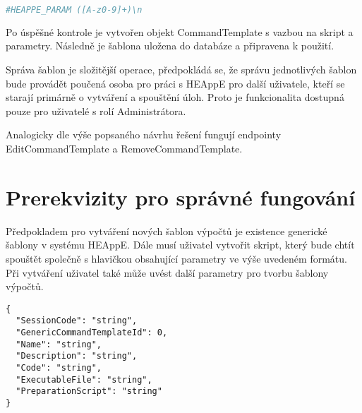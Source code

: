 \begin{lstlisting}[language=bash, caption={Regurální výraz pro parsování názvů parametrů}]
                                #HEAPPE_PARAM ([A-z0-9]+)\n
\end{lstlisting}

Po úspěšné kontrole je vytvořen objekt CommandTemplate s vazbou na skript a parametry. Následně je šablona uložena do databáze a připravena k použití.

Správa šablon je složitější operace, předpokládá se, že správu jednotlivých šablon bude provádět poučená osoba pro práci s HEAppE pro další uživatele, kteří se starají primárně o vytváření a spouštění úloh. Proto je funkcionalita dostupná pouze pro uživatelé s rolí Administrátora.

Analogicky dle výše popsaného návrhu řešení fungují endpointy EditCommandTemplate a RemoveCommandTemplate.

\section{Prerekvizity pro správné fungování}
Předpokladem pro vytváření nových šablon výpočtů je existence generické šablony v systému HEAppE. Dále musí uživatel vytvořit skript, který bude chtít spouštět společně s hlavičkou obsahující parametry ve výše uvedeném formátu. Při vytváření uživatel také může uvést další parametry pro tvorbu šablony výpočtů.



\begin{lstlisting}[caption={JSON struktura pro endpoint CreateCommandTemplate}]
{
  "SessionCode": "string",
  "GenericCommandTemplateId": 0,
  "Name": "string",
  "Description": "string",
  "Code": "string",
  "ExecutableFile": "string",
  "PreparationScript": "string"
} 
\end{lstlisting}



